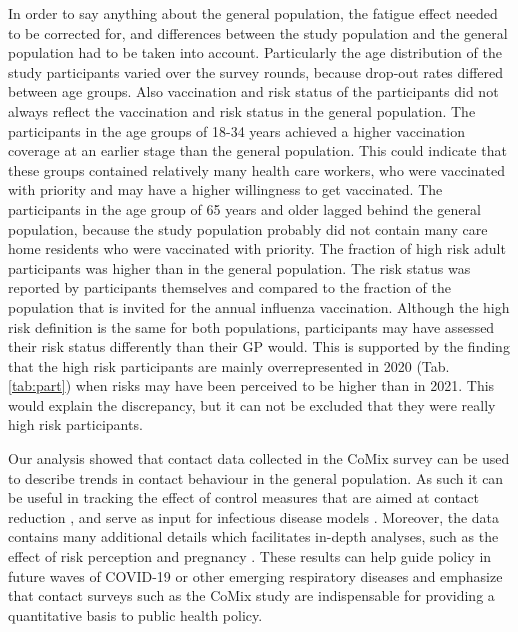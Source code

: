 \documentclass[fleqn,10pt]{wlscirep}
\begin{document}
In order to say anything about the general population, the fatigue effect needed to be corrected for, and differences between the study population and the general population had to be taken into account. Particularly the age distribution of the study participants varied over the survey rounds, because drop-out rates differed between age groups. Also vaccination and risk status of the participants did not always reflect the vaccination and risk status in the general population. The participants in the age groups of 18-34 years achieved a higher vaccination coverage at an earlier stage than the general population. This could indicate that these groups contained relatively many health care workers, who were vaccinated with priority and may have a higher willingness to get vaccinated. The participants in the age group of 65 years and older lagged behind the general population, because the study population probably did not contain many care home residents who were vaccinated with priority. The fraction of high risk adult participants was higher than in the general population. The risk status was reported by participants themselves and compared to the fraction of the population that is invited for the annual influenza vaccination. Although the high risk definition is the same for both populations, participants may have assessed their risk status differently than their GP would. This is supported by the finding that the high risk participants are mainly overrepresented in 2020 (Tab. \ref{tab:part}) when risks may have been perceived to be higher than in 2021. This would explain the discrepancy, but it can not be excluded that they were really high risk participants. 

Our analysis showed that contact data collected in the CoMix survey can be used to describe trends in contact behaviour in the general population. As such it can be useful in tracking the effect of control measures that are aimed at contact reduction \cite{Coletti_2020, Jarvis_2021, Gimma_2022}, and serve as input for infectious disease models \cite{Coletti_2021, Munday_2021, Franco_2022}. Moreover, the data contains many additional details which facilitates in-depth analyses, such as the effect of risk perception \cite{Wambua_2022} and pregnancy \cite{Wong_2022a}. These results can help guide policy in future waves of COVID-19 or other emerging respiratory diseases and emphasize that contact surveys such as the CoMix study are indispensable for providing a quantitative basis to public health policy.


\end{document}
